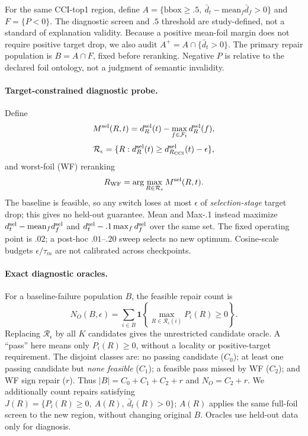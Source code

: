 \documentclass[10pt]{article}
\newcommand{\foils}{\mathcal F}
\newcommand{\regions}{\mathcal R}
\begin{document}
For the same CCI-top1 region, define
$A=\{\mathrm{bbox}\ge .5,\ \bar d_t-\mathrm{mean}_f\bar d_f>0\}$ and
$F=\{P<0\}$. The diagnostic screen and $.5$ threshold are study-defined,
not a standard of explanation validity. Because a positive mean-foil margin
does not require positive target drop, we also audit
$A^+=A\cap\{\bar d_t>0\}$. The primary repair population is
$B=A\cap F$, fixed before reranking. Negative $P$ is relative to the declared
foil ontology, not a judgment of semantic invalidity.

\paragraph{Target-constrained diagnostic probe.}
Define
\begin{equation}
M^{\rm sel}(R,t)=d_R^{\rm sel}(t)-\max_{f\in\foils_t}d_R^{\rm sel}(f),
\end{equation}
\begin{equation}
\regions_\epsilon=\{R:d_R^{\rm sel}(t)\ge d_{R_{\rm CCI}}^{\rm sel}(t)-\epsilon\},
\label{eq:feasible}
\end{equation}
and worst-foil (WF) reranking
\begin{equation}
R_{\rm WF}=\arg\max_{R\in\regions_\epsilon}M^{\rm sel}(R,t).
\label{eq:wf}
\end{equation}
The baseline is feasible, so any switch loses at most $\epsilon$ of
\emph{selection-stage} target drop; this gives no held-out guarantee.
Mean and Max-.1 instead maximize $d_t^{\rm sel}-\mathrm{mean}_f d_f^{\rm sel}$
and $d_t^{\rm sel}-.1\max_f d_f^{\rm sel}$ over the same set.
The fixed operating point is $.02$; a post-hoc $.01$--$.20$ sweep selects no
new optimum. Cosine-scale budgets $\epsilon/\tau_m$ are not calibrated
across checkpoints.

\paragraph{Exact diagnostic oracles.}
For a baseline-failure population $B$, the feasible repair count is
\begin{equation}
N_O(B,\epsilon)=\sum_{i\in B}\mathbf1\!\left\{
\max_{R\in\regions_\epsilon(i)}P_i(R)\ge0\right\}.
\label{eq:oracle}
\end{equation}
Replacing $\regions_\epsilon$ by all $K$ candidates gives the unrestricted
candidate oracle. A ``pass'' here means only $P_i(R)\ge0$, without a locality
or positive-target requirement. The disjoint classes are: no passing candidate
($C_0$); at least one passing candidate but \emph{none feasible} ($C_1$);
a feasible pass missed by WF ($C_2$); and WF sign repair ($r$).
Thus $|B|=C_0+C_1+C_2+r$ and $N_O=C_2+r$. We additionally count repairs
satisfying $J(R)=\{P_i(R)\ge0,\ A(R),\ \bar d_t(R)>0\}$; $A(R)$ applies
the same full-foil screen to the new region, without changing original $B$.
Oracles use held-out data only for diagnosis.
\end{document}
